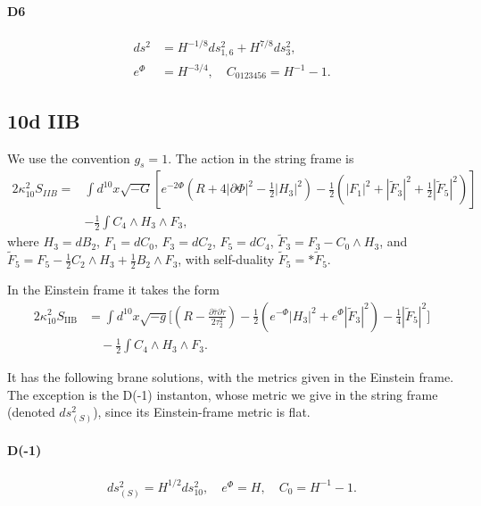 \paragraph{D6}
\begin{equation}
\begin{aligned}
ds^2 
&= H^{-1/8}ds_{1,6}^2 + H^{7/8}ds_3^2,\\
e^{\Phi}
&= H^{-3/4},\quad
C_{0123456} = H^{-1}-1.
\end{aligned}
\end{equation}

\subsection*{10d IIB}

We use the convention $g_s = 1$.
The action in the string frame is
\begin{equation}
\begin{aligned}
2\kappa_{10}^2 S_{IIB} =
&\int d^{10}x\sqrt{-G}\left[
    e^{-2\Phi}\left(R+4|\partial\Phi|^2-\frac{1}{2}|H_3|^2\right)
    -\frac{1}{2}\left(|F_1|^2+|\tilde{F}_3|^2+\frac{1}{2}|\tilde{F}_5|^2\right)
\right]\\
&- \frac{1}{2}\int C_4\wedge H_3\wedge F_3,
\end{aligned}
\end{equation}
where $H_3 = dB_2$, $F_1 = dC_0$, $F_3 = dC_2$, $F_5 = dC_4$, $\tilde{F}_3 = F_3 - C_0 \wedge H_3$, and $\tilde{F}_5 = F_5 - \frac{1}{2}C_2 \wedge H_3 + \frac{1}{2}B_2 \wedge F_3$, with self-duality $\tilde{F}_5 = *\tilde{F}_5$.

In the Einstein frame it takes the form
\begin{equation}
\begin{aligned}
2\kappa_{10}^2S_{\mathrm{IIB}}
&=\int d^{10}x\sqrt{-g}
\Bigg[\left(R-\frac{\partial\bar\tau\partial\tau}{2\tau_2^2}\right)-\frac{1}{2}\left(e^{-\Phi}|H_3|^2+e^{\Phi}|\tilde F_3|^2\right)-\frac{1}{4}|\tilde F_5|^2\Bigg]\\
&\quad-\frac{1}{2}\int C_4\wedge H_3\wedge F_3.
\label{einstein frame}
\end{aligned}
\end{equation}

It has the following brane solutions, with the metrics given in the Einstein frame. The exception is the D(-1) instanton, whose metric we give in the string frame (denoted $ds_{(S)}^2$), since its Einstein-frame metric is flat.

\paragraph{D(-1)}
\begin{equation}
\begin{aligned}
ds_{(S)}^2 = H^{1/2}ds_{10}^2,\quad
e^{\Phi} = H,\quad
C_0 = H^{-1}-1.
\end{aligned}
\end{equation}

